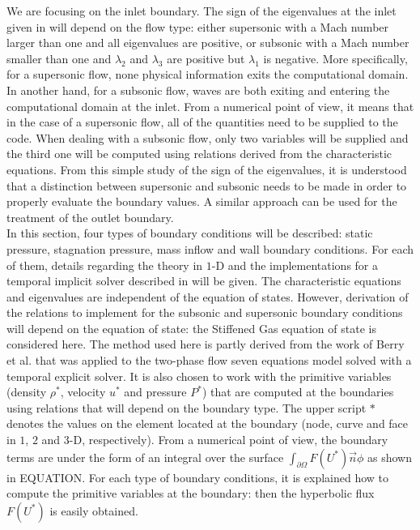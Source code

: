 We are focusing on the inlet boundary. The sign of the eigenvalues at the inlet given in  will depend on the flow type: either supersonic with a Mach number larger than one and all eigenvalues are positive, or subsonic with a Mach number smaller than one and $\lambda_2$ and $\lambda_3$ are positive but $\lambda_1$ is negative. More specifically, for a supersonic flow, none physical information exits the computational domain. In another hand, for a subsonic flow, waves are both exiting and entering the computational domain at the inlet. From a numerical point of view, it means that in the case of a supersonic flow, all of the quantities need to be supplied to the code. When dealing with a subsonic flow, only two variables will be supplied and the third one will be computed using relations derived from the characteristic equations. From this simple study of the sign of the eigenvalues, it is understood that a distinction between supersonic and subsonic needs to be made in order to properly evaluate the boundary values. A similar approach can be used for the treatment of the outlet boundary. \\
In this section, four types of boundary conditions will be described: static pressure, stagnation pressure, mass inflow and wall boundary conditions. For each of them, details regarding the theory in $1$-D and the implementations for a temporal implicit solver described in  will be given. The characteristic equations and eigenvalues are independent of the equation of states. However, derivation of the relations to implement for the subsonic and supersonic boundary conditions will depend on the equation of state: the Stiffened Gas equation of state is considered here. The method used here is partly derived from the work of Berry et al. \cite{SEM} that was applied to the two-phase flow seven equations model solved with a temporal explicit solver. It is also chosen to work with the primitive variables (density $\rho^*$, velocity $u^*$ and pressure $P^*$) that are computed at the boundaries using relations that will depend on the boundary type. The upper script $*$ denotes the values on the element located at the boundary (node, curve and face in $1$, $2$ and $3$-D, respectively). From a numerical point of view, the boundary terms are under the form of an integral over the surface $\int_{\partial \Omega} F(U^*) \vec{n} \phi$ as shown in EQUATION. For each type of boundary conditions, it is explained how to compute the primitive variables at the boundary: then the hyperbolic flux $F(U^*)$ is easily obtained.
